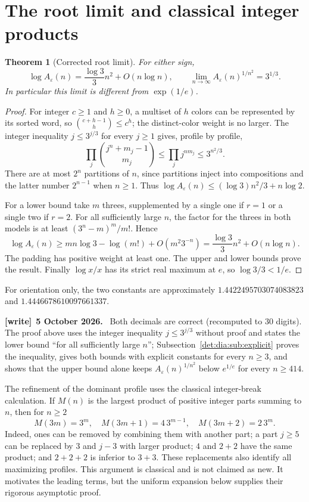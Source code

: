 \documentclass[11pt,letterpaper]{article}
\numberwithin{equation}{section}
\newtheorem{theorem}{Theorem}[section]
\theoremstyle{definition}\newtheorem{definition}[theorem]{Definition}
\theoremstyle{remark}\newtheorem{remark}[theorem]{Remark}
\newcommand{\eps}{\varepsilon}
\newenvironment{writenote}[1][]{\par\smallskip\begingroup\small
 \noindent\textbf{[write]}\if\relax\detokenize{#1}\relax\else~\textbf{#1.}\fi\ }%
 {\par\endgroup\smallskip}
\begin{document}
\section{The root limit and classical integer products}\label{det:dia:sec:root}
\begin{theorem}[Corrected root limit]\label{det:dia:thm:root}
For either sign,
\begin{equation}\label{det:dia:eq:root}
 \log A_\eps(n)=\frac{\log3}{3}n^2+O(n\log n),\qquad
 \lim_{n\to\infty} A_\eps(n)^{1/n^2}=3^{1/3}.
\end{equation}
In particular this limit is different from $\exp(1/e)$.
\end{theorem}
\begin{proof}
For integer $c\geq1$ and $h\geq0$, a multiset of $h$ colors can be
represented by its sorted word, so $\binom{c+h-1}{h}\leq c^h$; the
distinct-color weight is no larger. The integer inequality
$j\leq3^{j/3}$ for every $j\geq1$ gives, profile by profile,
\[
 \prod_j\binom{j^n+m_j-1}{m_j}
 \leq \prod_j j^{nm_j}\leq3^{n^2/3}.
\]
There are at most $2^n$ partitions of $n$, since partitions inject into
compositions and the latter number $2^{n-1}$ when $n\geq1$. Thus
$\log A_\eps(n)\leq(\log3)n^2/3+n\log2$.

For a lower bound take $m$ threes, supplemented by a single one if $r=1$
or a single two if $r=2$. For all sufficiently large $n$, the factor for
the threes in both models is at least $(3^n-m)^m/m!$. Hence
\[
 \log A_\eps(n)\geq mn\log3-\log(m!)+O(m^2 3^{-n})
 =\frac{\log3}{3}n^2+O(n\log n).
\]
The padding has positive weight at least one. The upper and lower bounds
prove the result. Finally $\log x/x$ has its strict real maximum at $e$,
so $\log3/3<1/e$.
\end{proof}
For orientation only, the two constants are approximately
$1.4422495703074083823$ and $1.4446678610097661337$.
\begin{writenote}[5 October 2026]
Both decimals are correct (recomputed to 30 digits). The proof above uses the integer inequality $j\le3^{j/3}$ without proof and states the lower bound ``for all sufficiently large $n$''; Subsection~\ref{det:dia:sub:explicit} proves the inequality, gives both bounds with explicit constants for every $n\ge3$, and shows that the upper bound alone keeps $A_\eps(n)^{1/n^2}$ below $e^{1/e}$ for every $n\ge414$.
\end{writenote}

The refinement of the dominant profile uses the classical integer-break
calculation. If $M(n)$ is the largest product of positive integer parts
summing to $n$, then for $n\geq2$
\begin{equation}\label{det:dia:eq:integerbreak}
 M(3m)=3^m,\quad M(3m+1)=4\,3^{m-1},\quad
 M(3m+2)=2\,3^m.
\end{equation}
Indeed, ones can be removed by combining them with another part;
a part $j\geq5$ can be replaced by $3$ and $j-3$ with larger product;
$4$ and $2+2$ have the same product; and $2+2+2$ is inferior to $3+3$.
These replacements also identify all maximizing profiles. This argument
is classical and is not claimed as new. It motivates the leading terms,
but the uniform expansion below supplies their rigorous asymptotic proof.
\end{document}

